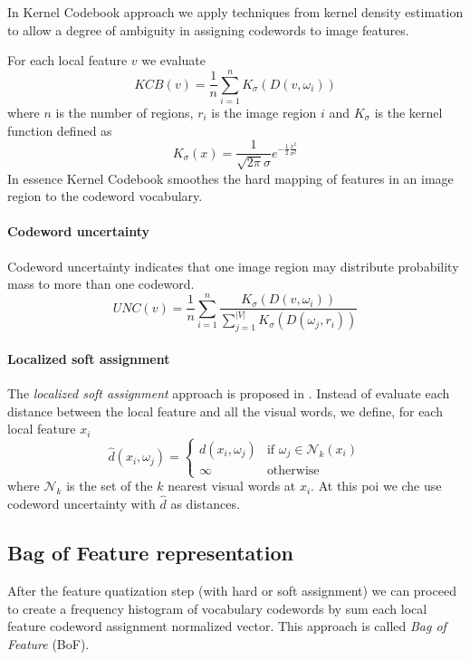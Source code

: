 In Kernel Codebook approach we apply techniques from kernel density estimation to allow a degree of ambiguity in assigning codewords to image features. 

For each local feature $v$ we evaluate
\begin{equation}
KCB(v) = \frac{1}{n} \sum_{i = 1}^{n} K_{\sigma}(D(v, \omega_i))
\end{equation}
where $n$ is the number of regions, $r_i$ is the image region $i$ and $K_{\sigma}$ is the kernel function defined as
\begin{equation}
K_{\sigma} (x) = \frac{1}{\sqrt{2\pi} \sigma} e^{- \frac{1}{2} \frac{x^2}{\sigma^2}}
\end{equation}
In essence Kernel Codebook smoothes the hard mapping of features in an image region to the codeword vocabulary.

\paragraph{Codeword uncertainty}

Codeword uncertainty indicates that one image region may distribute probability mass to more than one codeword.
\begin{equation}
UNC(v) = \frac{1}{n} \sum_{i = 1}^{n} \frac{K_{\sigma}(D(v, \omega_i))}{\sum_{j=1}^{|V|} K_{\sigma}(D(\omega_j, r_i))}
\end{equation}

\paragraph{Localized soft assignment}

The \emph{localized soft assignment} approach is proposed in \cite{LingqiaoLiu:2011:DSC:2355573.2356438}. Instead of evaluate each distance between the local feature and all the visual words, we define, for each local feature $x_i$
\begin{equation}
\hat{d}(x_i, \omega_j) =
\left\{
\begin{array}{ll}
d(x_i, \omega_j) & \mbox{if } \omega_j \in \mathcal{N}_k(x_i) \\
\infty & \mbox{otherwise}
\end{array}
\right.
\end{equation}
where $\mathcal{N}_k$ is the set of the $k$ nearest visual words at $x_i$. At this poi we che use codeword uncertainty with $\hat{d}$ as distances.

\subsection{Bag of Feature representation}

After the feature quatization step (with hard or soft assignment) we can proceed to create a frequency histogram of vocabulary codewords by sum each local feature codeword assignment normalized vector. This approach is called \emph{Bag of Feature} (BoF).




